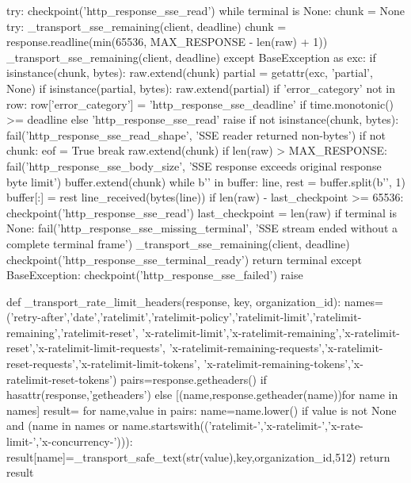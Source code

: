 {    try:
        checkpoint('http_response_sse_read')
        while terminal is None:
            chunk = None
            try:
                _transport_sse_remaining(client, deadline)
                chunk = response.readline(min(65536, MAX_RESPONSE - len(raw) + 1))
                _transport_sse_remaining(client, deadline)
            except BaseException as exc:
                if isinstance(chunk, bytes):
                    raw.extend(chunk)
                partial = getattr(exc, 'partial', None)
                if isinstance(partial, bytes):
                    raw.extend(partial)
                if 'error_category' not in row:
                    row['error_category'] = 'http_response_sse_deadline' if time.monotonic() >= deadline else 'http_response_sse_read'
                raise
            if not isinstance(chunk, bytes):
                fail('http_response_sse_read_shape', 'SSE reader returned non-bytes')
            if not chunk:
                eof = True
                break
            raw.extend(chunk)
            if len(raw) > MAX_RESPONSE:
                fail('http_response_sse_body_size', 'SSE response exceeds original response byte limit')
            buffer.extend(chunk)
            while b'\n' in buffer:
                line, rest = buffer.split(b'\n', 1)
                buffer[:] = rest
                line_received(bytes(line))
            if len(raw) - last_checkpoint >= 65536:
                checkpoint('http_response_sse_read')
                last_checkpoint = len(raw)
        if terminal is None:
            fail('http_response_sse_missing_terminal', 'SSE stream ended without a complete terminal frame')
        _transport_sse_remaining(client, deadline)
        checkpoint('http_response_sse_terminal_ready')
        return terminal
    except BaseException:
        checkpoint('http_response_sse_failed')
        raise



def _transport_rate_limit_headers(response, key, organization_id):
    names=('retry-after','date','ratelimit','ratelimit-policy','ratelimit-limit','ratelimit-remaining','ratelimit-reset',
           'x-ratelimit-limit','x-ratelimit-remaining','x-ratelimit-reset','x-ratelimit-limit-requests',
           'x-ratelimit-remaining-requests','x-ratelimit-reset-requests','x-ratelimit-limit-tokens',
           'x-ratelimit-remaining-tokens','x-ratelimit-reset-tokens')
    pairs=response.getheaders() if hasattr(response,'getheaders') else [(name,response.getheader(name))for name in names]
    result={}
    for name,value in pairs:
        name=name.lower()
        if value is not None and (name in names or name.startswith(('ratelimit-','x-ratelimit-','x-rate-limit-','x-concurrency-'))):
            result[name]=_transport_safe_text(str(value),key,organization_id,512)
    return result


}
